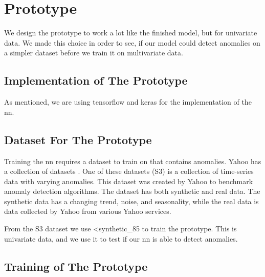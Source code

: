 \section{Prototype}
We design the prototype to work a lot like the finished model, but for univariate data. We made this choice in order to see, if our model could detect anomalies on a simpler dataset before we train it on multivariate data.

\subsection{Implementation of The Prototype}
As mentioned, we are using \gls{tensorflow} and \gls{keras} for the implementation of the \gls{nn}. 


\subsection{Dataset For The Prototype}
Training the \gls{nn} requires a dataset to train on that contains anomalies. Yahoo has a collection of datasets \cite{yahoo_datasets}. One of these datasets (S3) is a collection of time-series data with varying anomalies. This dataset was created by Yahoo to benchmark anomaly detection algorithms. The dataset has both synthetic and real data. The synthetic data has a changing trend, noise, and seasonality, while the real data is data collected by Yahoo from various Yahoo services.

From the S3 dataset we use <synthetic\_85 to train the prototype. This is univariate data, and we use it to test if our \gls{nn} is able to detect anomalies.

\subsection{Training of The Prototype}